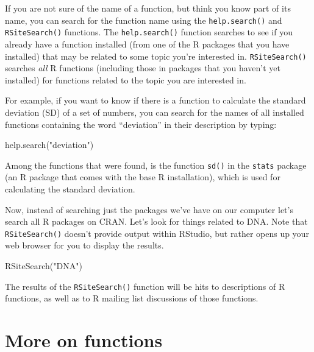 \documentclass[
]{book}
\newenvironment{Shaded}{\begin{snugshade}}{\end{snugshade}}
\newcommand{\FunctionTok}[1]{\textcolor[rgb]{0.00,0.00,0.00}{#1}}
\newcommand{\NormalTok}[1]{#1}
\newcommand{\StringTok}[1]{\textcolor[rgb]{0.31,0.60,0.02}{#1}}
\begin{document}
If you are not sure of the name of a function, but think you know part of its name, you can search for the function name using the \texttt{help.search()} and \texttt{RSiteSearch()} functions. The \texttt{help.search()} function searches to see if you already have a function installed (from one of the R packages that you have installed) that may be related to some topic you're interested in. \texttt{RSiteSearch()} searches \emph{all} R functions (including those in packages that you haven't yet installed) for functions related to the topic you are interested in.

For example, if you want to know if there is a function to calculate the standard deviation (SD) of a set of numbers, you can search for the names of all installed functions containing the word ``deviation'' in their description by typing:

\begin{Shaded}
\begin{Highlighting}[]
\FunctionTok{help.search}\NormalTok{(}\StringTok{"deviation"}\NormalTok{)}
\end{Highlighting}
\end{Shaded}

Among the functions that were found, is the function \texttt{sd()} in the \texttt{stats} package (an R package that comes with the base R installation), which is used for calculating the standard deviation.

Now, instead of searching just the packages we've have on our computer let's search all R packages on CRAN. Let's look for things related to DNA. Note that \texttt{RSiteSearch()} doesn't provide output within RStudio, but rather opens up your web browser for you to display the results.

\begin{Shaded}
\begin{Highlighting}[]
\FunctionTok{RSiteSearch}\NormalTok{(}\StringTok{"DNA"}\NormalTok{)}
\end{Highlighting}
\end{Shaded}

The results of the \texttt{RSiteSearch()} function will be hits to descriptions of R functions, as well as to R mailing list discussions of those functions.

\hypertarget{more-on-functions}{%
\section{More on functions}\label{more-on-functions}}
\end{document}
